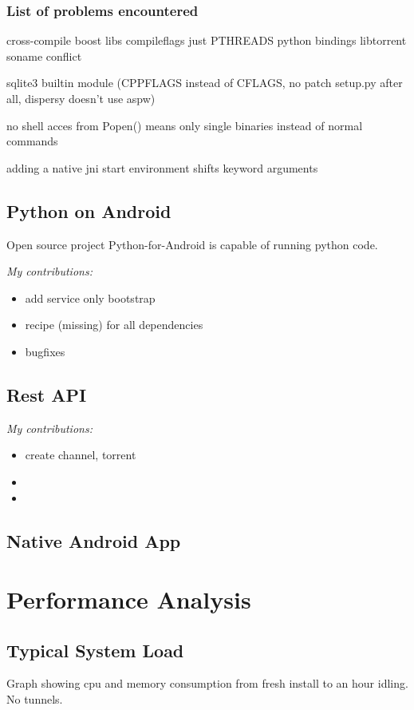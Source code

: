 \documentclass[]{report}
\begin{document}
\subsection*{List of problems encountered}
cross-compile boost libs compileflags just PTHREADS
python bindings libtorrent soname conflict


sqlite3 builtin module (CPPFLAGS instead of CFLAGS, no patch setup.py after all, dispersy doesn't use aspw)


no shell acces from Popen() means only single binaries instead of normal commands

adding a native jni start environment shifts keyword arguments



\section{Python on Android}
Open source project Python-for-Android is capable of running python code.

\emph{My contributions:}
\begin{itemize}
	\item add service only bootstrap
	\item recipe (missing) for all dependencies
	\item bugfixes
\end{itemize}


\section{Rest API}

\emph{My contributions:}
\begin{itemize}
	\item create channel, torrent
	\item 
	\item 
\end{itemize}


\section{Native Android App}



\chapter{Performance Analysis}

\section{Typical System Load}
Graph showing cpu and memory consumption from fresh install to an hour idling. No tunnels.
\end{document}
